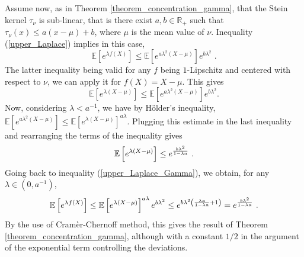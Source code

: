 \documentclass[11pt]{article}
\begin{document}
Assume now, as in Theorem \ref{theorem_concentration_gamma}, that the Stein
kernel $\tau _{\nu }$ is sub-linear, that is there exist $a,b\in \mathbb{R}%
_{+}$ such that $\tau _{\nu }\left( x\right) \leq a\left( x-\mu \right) +b$,
where $\mu $ is the mean value of $\nu $. Inequality (\ref{upper_Laplace})
implies in this case,%
\begin{equation}
\mathbb{E}\left[ e^{\lambda f\left( X\right) }\right] \leq \mathbb{E}\left[
e^{a\lambda ^{2}\left( X-\mu \right) }\right] e^{b\lambda ^{2}}\text{ .}
\label{upper_Laplace_Gamma}
\end{equation}%
The latter inequality being valid for any $f$ being $1$-Lipschitz and
centered with respect to $\nu $, we can apply it for $f\left( X\right)
=X-\mu $. This gives%
\begin{equation*}
\mathbb{E}\left[ e^{\lambda \left( X-\mu \right) }\right] \leq \mathbb{E}%
\left[ e^{a\lambda ^{2}\left( X-\mu \right) }\right] e^{b\lambda ^{2}}\text{
.}
\end{equation*}%
Now, considering $\lambda <a^{-1}$, we have by H\"{o}lder's inequality, $%
\mathbb{E}\left[ e^{a\lambda ^{2}\left( X-\mu \right) }\right] \leq \mathbb{E%
}\left[ e^{\lambda \left( X-\mu \right) }\right] ^{a\lambda }$. Plugging
this estimate in the last inequality and rearranging the terms of the
inequality gives%
\begin{equation*}
\mathbb{E}\left[ e^{\lambda \left( X-\mu \right) }\right] \leq e^{\frac{%
b\lambda ^{2}}{1-\lambda a}}\text{ .}
\end{equation*}%
Going back to inequality (\ref{upper_Laplace_Gamma}), we obtain, for any $%
\lambda \in \left( 0,a^{-1}\right) $,%
\begin{equation*}
\mathbb{E}\left[ e^{\lambda f\left( X\right) }\right] \leq \mathbb{E}\left[
e^{\lambda \left( X-\mu \right) }\right] ^{a\lambda }e^{b\lambda ^{2}}\leq
e^{b\lambda ^{2}\left( \frac{\lambda a}{1-\lambda a}+1\right) }=e^{\frac{%
b\lambda ^{2}}{1-\lambda a}}\text{ .}
\end{equation*}%
By the use of Cram\`{e}r-Chernoff method, this gives the result of Theorem %
\ref{theorem_concentration_gamma}, although with a constant $1/2$ in the
argument of the exponential term controlling the deviations.
\end{document}
